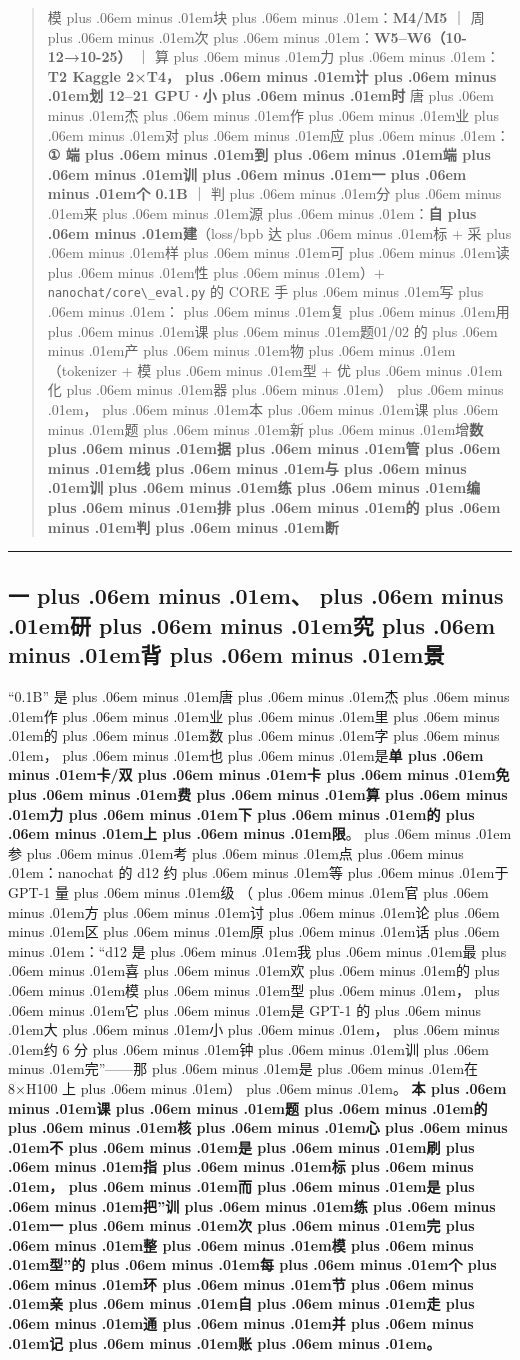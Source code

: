 \documentclass[
]{article}
\newcommand{\passthrough}[1]{#1}
\def\zh#1{{\zhfont #1}}
\def\sym#1{{\symfont #1}}
\def\zhglue{\hskip0pt plus .06em minus .01em}
\begin{document}
\begin{quote}
\zh{模\zhglue 块\zhglue ：}\textbf{M4/M5} \zh{｜} \zh{周\zhglue 次\zhglue ：}\textbf{W5--W6\zh{（}10-12\sym{→}10-25\zh{）}} \zh{｜} \zh{算\zhglue 力\zhglue ：}\textbf{T2 Kaggle 2\sym{×}T4\zh{，\zhglue 计\zhglue 划} 12--21 GPU\sym{·}\zh{小\zhglue 时}} \zh{唐\zhglue 杰\zhglue 作\zhglue 业\zhglue 对\zhglue 应\zhglue ：}\textbf{\sym{①} \zh{端\zhglue 到\zhglue 端\zhglue 训\zhglue 一\zhglue 个} 0.1B} \zh{｜} \zh{判\zhglue 分\zhglue 来\zhglue 源\zhglue ：}\textbf{\zh{自\zhglue 建}}\zh{（}loss/bpb \zh{达\zhglue 标} + \zh{采\zhglue 样\zhglue 可\zhglue 读\zhglue 性\zhglue ）}+ \passthrough{\lstinline!nanochat/core\_eval.py!} \zh{的} CORE \zh{手\zhglue 写\zhglue ：\zhglue 复\zhglue 用\zhglue 课\zhglue 题}01/02 \zh{的\zhglue 产\zhglue 物\zhglue （}tokenizer + \zh{模\zhglue 型} + \zh{优\zhglue 化\zhglue 器\zhglue ）\zhglue ，\zhglue 本\zhglue 课\zhglue 题\zhglue 新\zhglue 增}\textbf{\zh{数\zhglue 据\zhglue 管\zhglue 线\zhglue 与\zhglue 训\zhglue 练\zhglue 编\zhglue 排\zhglue 的\zhglue 判\zhglue 断}}
\end{quote}

\begin{center}\rule{0.5\linewidth}{0.5pt}\end{center}

\subsection{\zh{一\zhglue 、\zhglue 研\zhglue 究\zhglue 背\zhglue 景}}\label{ux4e00ux7814ux7a76ux80ccux666f-2}

``0.1B'' \zh{是\zhglue 唐\zhglue 杰\zhglue 作\zhglue 业\zhglue 里\zhglue 的\zhglue 数\zhglue 字\zhglue ，\zhglue 也\zhglue 是}\textbf{\zh{单\zhglue 卡}/\zh{双\zhglue 卡\zhglue 免\zhglue 费\zhglue 算\zhglue 力\zhglue 下\zhglue 的\zhglue 上\zhglue 限}}\zh{。\zhglue 参\zhglue 考\zhglue 点\zhglue ：}nanochat \zh{的} d12 \zh{约\zhglue 等\zhglue 于} GPT-1 \zh{量\zhglue 级} \zh{（\zhglue 官\zhglue 方\zhglue 讨\zhglue 论\zhglue 区\zhglue 原\zhglue 话\zhglue ：}``d12 \zh{是\zhglue 我\zhglue 最\zhglue 喜\zhglue 欢\zhglue 的\zhglue 模\zhglue 型\zhglue ，\zhglue 它\zhglue 是} GPT-1 \zh{的\zhglue 大\zhglue 小\zhglue ，\zhglue 约} 6 \zh{分\zhglue 钟\zhglue 训\zhglue 完}''------\zh{那\zhglue 是\zhglue 在} 8\sym{×}H100 \zh{上\zhglue ）\zhglue 。} \textbf{\zh{本\zhglue 课\zhglue 题\zhglue 的\zhglue 核\zhglue 心\zhglue 不\zhglue 是\zhglue 刷\zhglue 指\zhglue 标\zhglue ，\zhglue 而\zhglue 是\zhglue 把}''\zh{训\zhglue 练\zhglue 一\zhglue 次\zhglue 完\zhglue 整\zhglue 模\zhglue 型}''\zh{的\zhglue 每\zhglue 个\zhglue 环\zhglue 节\zhglue 亲\zhglue 自\zhglue 走\zhglue 通\zhglue 并\zhglue 记\zhglue 账\zhglue 。}}
\end{document}
